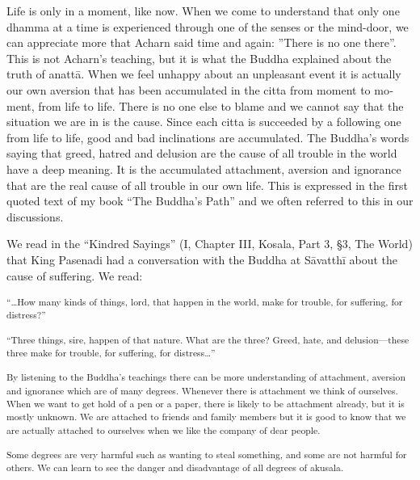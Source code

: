 \textdutch{Life is only in a moment, like now. When we come to
understand that only one dhamma at a time is experienced through one of
the senses or the mind-door, we can appreciate more that Acharn said
time and again: ''There is no one there''. This is not Acharn's
teaching, but it is what the Buddha explained about the truth of anattā.
When we feel unhappy about an unpleasant event it is actually our own
aversion that has been accumulated in the citta from moment to moment,
from life to life. There is no one else to blame and we cannot say that
the situation we are in is the cause. Since each citta is succeeded by a
following one from life to life, good and bad inclinations are
accumulated. The Buddha's words saying that greed, hatred and delusion
are the cause of all trouble in the world have a deep meaning. It is the
accumulated attachment, aversion and ignorance that are the real cause
of all trouble in our own life. This is expressed in the first quoted
text of my book ``The Buddha's Path'' and we often referred to this in
our discussions. }

\textdutch{We read in the ``}\textenglish[variant=american]{Kindred
Sayings}\textdutch{''} \textdutch{(I, Chapter III, Kosala, Part 3,
}§\textenglish[variant=american]{3, The World) that King Pasenadi had a
conversation with the Buddha at S}\textdanish{ā}vatthī
\textenglish[variant=american]{about the cause of suffering. We read:}

\textsuperscript{``\ldots{}\textenglish[variant=american]{How many kinds
of things, lord, that happen in the world, make for trouble, for
suffering, for distress?}''}

\textsuperscript{``\textenglish[variant=american]{Three things, sire,
happen of that nature. What are the three? Greed, hate, and
delusion---these three make for trouble, for suffering, for
distress}\ldots{}''}

\textsuperscript{\textdutch{{By listening to the Buddha's teachings
there can be more understanding of attachment, aversion and ignorance
which are of many degrees. Whenever there is attachment we think of
ourselves. When we want to get hold of a pen or a paper, there is likely
to be attachment already, but it is mostly unknown. We are attached to
friends and family members but it is good to know that we are actually
attached to ourselves when we like the company of dear people.}}}

\textsuperscript{\textdutch{{Some degrees are very harmful such as
wanting to steal something, and some are not harmful for others. We can
learn to see the danger and disadvantage of all degrees of akusala. }}}


